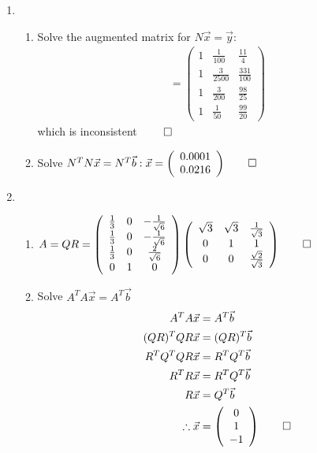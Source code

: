 \documentclass[12pt, a4paper]{article}
\begin{document}
\begin{enumerate}[Q\arabic*.]
  \item 
    \begin{enumerate}[(\alph*)]
      \item Solve the augmented matrix for $N \vec{x} = \vec{y}$:
        \begin{align*}
          [N \vec{x} \mid \vec{y}] = \left(\begin{array}{ccc} 1 & \frac{1}{100} & \frac{11}{4}\\ 1 & \frac{3}{2500} & \frac{331}{100}\\ 1 & \frac{3}{200} & \frac{98}{25}\\ 1 & \frac{1}{50} & \frac{99}{20} \end{array}\right)
        \end{align*}
        which is inconsistent $\qed$

      \item Solve $N^TN \vec{x} = N^T \vec{b}: \vec{x} = \left(\begin{array}{c} 0.0001\\0.0216\end{array}\right) \qed$
    \end{enumerate}


  \item 
    \begin{enumerate}[(\alph*)]
      \item $A = QR = \left(\begin{array}{ccc} \frac{1}{3} & 0 & -\frac{1}{\sqrt{6}}\\ \frac{1}{3} & 0 & -\frac{1}{\sqrt{6}}\\ \frac{1}{3} & 0 & \frac{2}{\sqrt{6}}\\ 0 & 1 & 0 \end{array}\right) \left(\begin{array}{ccc} \sqrt{3} & \sqrt{3} & \frac{1}{\sqrt{3}}\\ 0 & 1 & 1\\ 0 & 0 & \frac{\sqrt{2}}{\sqrt{3}} \end{array}\right)\qed$

      \item Solve $A^TA \vec{x} = A^T \vec{b}$
        \begin{align*}
          A^TA \vec{x} &= A^T \vec{b}\\
          (QR)^T QR \vec{x} &= (QR)^T \vec{b}\\
          R^TQ^T QR \vec{x} &= R^TQ^T \vec{b}\\
          R^TR \vec{x} &= R^TQ^T \vec{b}\\
          R \vec{x} &= Q^T \vec{b}\\
          \therefore \vec{x} &= \left(\begin{array}{c} 0\\ 1\\ -1 \end{array}\right) \qed
        \end{align*}
    \end{enumerate}
\end{enumerate}
\end{document}
